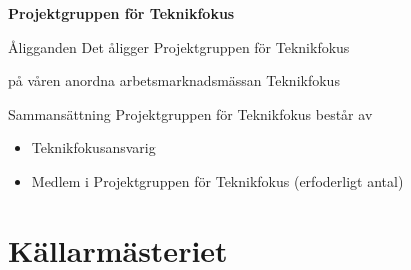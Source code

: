 \documentclass[pdfbookmarks,a4paper,11pt]{article}
\newlength{\itemcollength}
\newenvironment{reglemlista}{%
  \begin{list}{}{%
      \setlength{\labelwidth}{\itemcollength}%
      \setlength{\leftmargin}{\labelwidth + \labelsep}%
      \renewcommand{\makelabel}[1]{%
        \raisebox{0pt}[1ex][0pt]{%
          \makebox[\labelwidth][l]{%
            \parbox[t]{\itemcollength}{%
              \raggedright\hspace{0pt}##1}}}\hfill}%
      }}{%
  \end{list}}
\begin{document}
\textbf{Projektgruppen för Teknikfokus}
\begin{reglemlista}
	\item[Åligganden]
	Det åligger Projektgruppen för Teknikfokus

	\begin{attlista}
		\item på våren anordna arbetsmarknadsmässan Teknikfokus
	\end{attlista}

	\item[Sammansättning]
	Projektgruppen för Teknikfokus består av
	\begin{itemize}
		\item Teknikfokusansvarig
		\item Medlem i Projektgruppen för Teknikfokus (erfoderligt antal)
	\end{itemize}

\end{reglemlista}


\section{Källarmästeriet}
\end{document}
